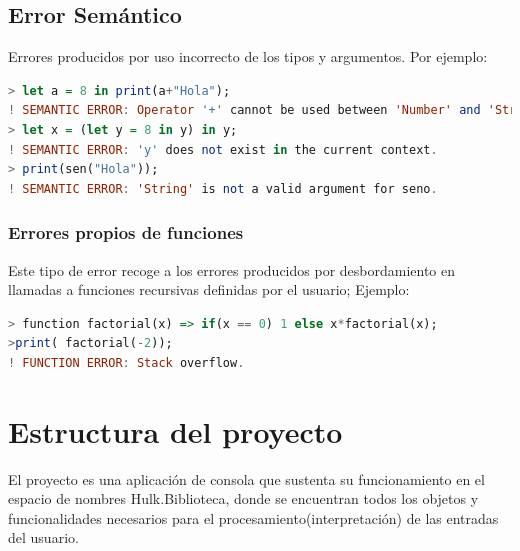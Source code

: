 \documentclass[a4paper, 12pt]{article}
\begin{document}
\subsection{Error Semántico}
Errores producidos por uso incorrecto de los tipos y argumentos. Por ejemplo:
\begin{lstlisting}[language= Haskell]
> let a = 8 in print(a+"Hola");
! SEMANTIC ERROR: Operator '+' cannot be used between 'Number' and 'String'.
> let x = (let y = 8 in y) in y;
! SEMANTIC ERROR: 'y' does not exist in the current context.
> print(sen("Hola"));
! SEMANTIC ERROR: 'String' is not a valid argument for seno.
\end{lstlisting}

\subsubsection{Errores propios de funciones}
Este tipo de error recoge a los errores producidos por desbordamiento en llamadas a funciones recursivas definidas por el usuario;
Ejemplo:
\begin{lstlisting}[language= Haskell]
> function factorial(x) => if(x == 0) 1 else x*factorial(x);
>print( factorial(-2));
! FUNCTION ERROR: Stack overflow.
\end{lstlisting}




\newpage
\section{Estructura del proyecto}\label{}
El proyecto es una aplicación de consola que sustenta su funcionamiento en el espacio de nombres Hulk.Biblioteca, donde se encuentran todos los objetos y funcionalidades necesarios para el procesamiento(interpretación) de las entradas del usuario.
\end{document}
